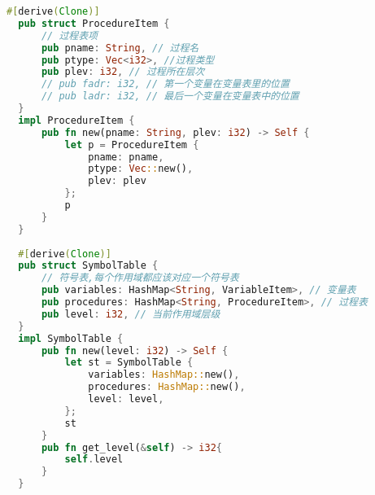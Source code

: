 \begin{lstlisting}[caption={符号表控制器env.rs}, label={5:code-example}, captionpos=t, language=rust]
  #[derive(Clone)]
  pub struct ProcedureItem {
      // 过程表项
      pub pname: String, // 过程名
      pub ptype: Vec<i32>, //过程类型
      pub plev: i32, // 过程所在层次
      // pub fadr: i32, // 第一个变量在变量表里的位置
      // pub ladr: i32, // 最后一个变量在变量表中的位置
  }
  impl ProcedureItem {
      pub fn new(pname: String, plev: i32) -> Self {
          let p = ProcedureItem {
              pname: pname, 
              ptype: Vec::new(),
              plev: plev
          };
          p
      }
  }
  
  #[derive(Clone)]
  pub struct SymbolTable {
      // 符号表,每个作用域都应该对应一个符号表
      pub variables: HashMap<String, VariableItem>, // 变量表
      pub procedures: HashMap<String, ProcedureItem>, // 过程表
      pub level: i32, // 当前作用域层级
  }
  impl SymbolTable {
      pub fn new(level: i32) -> Self {
          let st = SymbolTable {
              variables: HashMap::new(),
              procedures: HashMap::new(),
              level: level,
          };
          st
      }
      pub fn get_level(&self) -> i32{
          self.level
      }
  }
  

\end{lstlisting}

